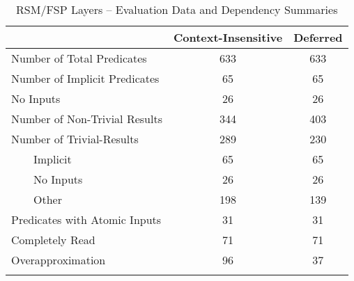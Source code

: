 \documentclass[11pt]{article}
\begin{document}
\newcommand{\tabitem}{~~\llap{\textbullet}~~}
\newcommand{\tabitemindent}{}

\begin{table}[hbtp]
\caption{RSM/FSP Layers -- Evaluation Data and Dependency \mbox{Summaries}}
\centering
\begin{tabular}{lcc} \toprule
    {}         & {Context-Insensitive} & {Deferred} 
                                                                          \\ \midrule
Number of Total Predicates       & 633                & 633                   \\ \midrule
Number of Implicit Predicates  & 65                 & 65                    \\ \toprule
No Inputs                    & 26                 & 26                    \\\midrule
Number of Non-Trivial Results  & 344                & 403                   \\\midrule
Number of Trivial-Results        & 289                & 230        \\%
  \tabitem Implicit & \tabitemindent 65  & \tabitemindent 65 \\
  \tabitem No Inputs & \tabitemindent 26  & \tabitemindent 26 \\
  \tabitem Other & \tabitemindent 198 & \tabitemindent 139 \\\midrule
Predicates with Atomic Inputs & 31           & 31                     \\\midrule
Completely Read                    & 71           & 71                     \\\midrule
Overapproximation                  & 96           & 37                     \\ \bottomrule\\
\end{tabular}
\label{res:statsprecisiondep}
\end{table}
\end{document}
